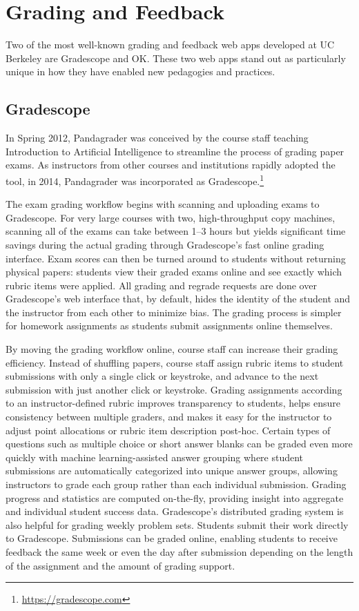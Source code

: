 \section{Grading and Feedback}

Two of the most well-known grading and feedback web apps developed at UC Berkeley are Gradescope and OK. These two web apps stand out as particularly unique in how they have enabled new pedagogies and practices.

\subsection{Gradescope}

In Spring 2012, Pandagrader was conceived by the course staff teaching Introduction to Artificial Intelligence to streamline the process of grading paper exams. As instructors from other courses and institutions rapidly adopted the tool, in 2014, Pandagrader was incorporated as Gradescope.\footnote{\url{https://gradescope.com}}

The exam grading workflow begins with scanning and uploading exams to Gradescope. For very large courses with two, high-throughput copy machines, scanning all of the exams can take between 1--3 hours but yields significant time savings during the actual grading through Gradescope's fast online grading interface. Exam scores can then be turned around to students without returning physical papers: students view their graded exams online and see exactly which rubric items were applied. All grading and regrade requests are done over Gradescope's web interface that, by default, hides the identity of the student and the instructor from each other to minimize bias. The grading process is simpler for homework assignments as students submit assignments online themselves.

By moving the grading workflow online, course staff can increase their grading efficiency. Instead of shuffling papers, course staff assign rubric items to student submissions with only a single click or keystroke, and advance to the next submission with just another click or keystroke. Grading assignments according to an instructor-defined rubric improves transparency to students, helps ensure consistency between multiple graders, and makes it easy for the instructor to adjust point allocations or rubric item description post-hoc. Certain types of questions such as multiple choice or short answer blanks can be graded even more quickly with machine learning-assisted answer grouping where student submissions are automatically categorized into unique answer groups, allowing instructors to grade each group rather than each individual submission. Grading progress and statistics are computed on-the-fly, providing insight into aggregate and individual student success data. Gradescope's distributed grading system is also helpful for grading weekly problem sets. Students submit their work directly to Gradescope. Submissions can be graded online, enabling students to receive feedback the same week or even the day after submission depending on the length of the assignment and the amount of grading support.


